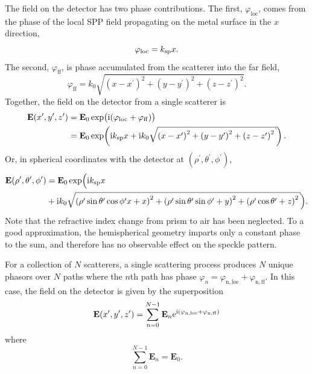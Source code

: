 The field on the detector has two phase contributions. The first,
$\varphi_\mathrm{loc}$, comes from
the phase of the local SPP field propagating on the metal surface in the $x$
direction,
\begin{equation}
\varphi_\mathrm{loc} = k_\mathrm{sp} x.
\end{equation}
The second, $\varphi_\mathrm{ff}$, is phase accumulated from the scatterer into the far field,
\begin{equation}
				\varphi_\mathrm{ff} =
				k_0\sqrt{{(x-x^\prime)}^2+{(y-y^\prime)}^2+{(z-z^\prime)}^2}.
\end{equation}
Together, the field on the detector from a single scatterer is
\begin{align}
\mathbf{E}(x^\prime,y^\prime,z^\prime) &=
\mathbf{E}_0\exp\bigl(\mi(\varphi_\mathrm{loc}+\varphi_\mathrm{ff})\bigr)\\
&= \mathbf{E}_0\exp\!\left(\mi\ksp x + %
\mi k_0\sqrt{{(x-x^\prime)}^2+{(y-y^\prime)}^2+{(z-z^\prime)}^2}\right).
\end{align}
Or, in spherical coordinates with the detector at
$(\rho^\prime,\theta^\prime,\phi^\prime)$,
\begin{align}
				\mathbf{E}(\rho^\prime,\theta^\prime,\phi^\prime) &= \mathbf{E}_0\exp\Bigl(\mi\ksp x \\
&+ \mi k_0\sqrt{{(\rho^\prime\sin\theta^\prime\cos\phi^\prime
x+x)}^2+{(\rho^\prime\sin\theta^\prime\sin\phi^\prime+y)}^2+{(\rho^\prime\cos\theta^\prime+z)}^2
} \Bigr).
\label{eqn:scattspherical}
\end{align}
Note that the refractive index change from prism to air has been neglected.
To a good approximation, the hemispherical geometry imparts only a constant
phase to the sum, and therefore has no observable effect on the speckle
pattern.

For a collection of $N$ scatterers, a single scattering process produces $N$
unique phasors over $N$ paths where the $n$th path has 
phase $\varphi_n = \varphi_\mathrm{n,loc}+\varphi_\mathrm{n,ff}$.  In this
case, the field on the detector
is given by the superposition 
\begin{equation}
\mathbf{E}(x^\prime,y^\prime,z^\prime) =
\sum_{n=0}^{N-1}
\mathbf{E}_n {\mathrm{e}}^{{\mathrm{i}}{(\varphi_\mathrm{n,loc}+\varphi_\mathrm{n,ff})}}
\end{equation}
where
\begin{equation}
\sum_{n=0}^{N-1}\mathbf{E}_n = \mathbf{E}_0.
\end{equation}

